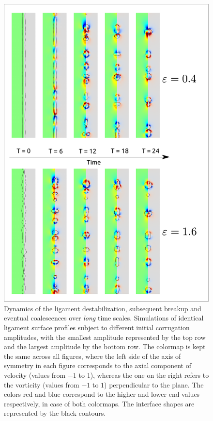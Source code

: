 \begin{figure}
\centering
\includegraphics{plots/ligament_breakup/amp_compare_long.pdf}
	\caption{Dynamics of the ligament destabilization, subsequent breakup 
	and eventual coalescences over \textit{long} time scales.
	Simulations of identical ligament surface profiles
	subject to different initial corrugation amplitudes, with the smallest 
	amplitude represented by the top row and the largest amplitude by the bottom row. 
	The colormap is kept the same across all figures, where the left 
	side of the axis of symmetry in each figure corresponds to the axial component of 
	velocity (values from $-1$ to $1$), whereas the one on the right refers to 
	the vorticity (values from $-1$ to $1$) perpendicular to the plane. 
	The colors red and blue correspond to the higher and lower 
	end values respectively, in case of both colormaps. 
	The interface shapes are represented by the black contours.
	}
\label{amp_comp_long}
\end{figure}

